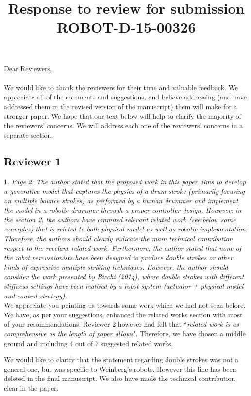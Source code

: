 \documentclass[]{article}
\title{Response to review for submission ROBOT-D-15-00326}
\author{}
\date{\vspace{-0.5cm}}
\begin{document}
\maketitle
\noindent Dear Reviewers,\\ \\
\noindent We would like to thank the reviewers for their time and valuable feedback.  We appreciate all of the comments and suggestions, and believe addressing (and have addressed them in the revised version of the manuscript) them will make for a stronger paper. We hope that our text below will help to clarify the majority of the reviewers' concerns. 
We will address each one of the reviewers' concerns in a separate section. 

\subsection*{Reviewer 1}
1. \textit{Page 2: The author stated that the proposed work in this paper aims to develop a generative model that captures the physics of a drum stroke
	(primarily focusing on multiple bounce strokes) as performed by a human drummer and implement the model in a robotic drummer through a proper
	controller design.  However, in the section 2, the authors have ommited relevant related work (see below some examples) that is related to both
	physical model as well as robotic implementation. Therefore, the authors should clearly indicate the main technical contribution respect to the
	revelant related work. Furthermore, the author stated that none of the robot percussionists have been designed to produce double strokes
	or other kinds of expressive multiple striking techniques. However, the author should consider the work presented by Bicchi (2014),
	where double strokes with different stiffness settings have been realized by a robot system (actuator + physical model and control strategy).}\\

\noindent We appreciate you pointing us towards some work which we had not seen before. We have, as per your suggestions, enhanced the related works section with most of your recommendations. Reviewer 2 however had felt that ``\textit{related work is as comprehensive as the length of paper allows}". Therefore, we have chosen a middle ground and including 4 out of 7 suggested related works. 

\noindent We would like to clarify that the statement regarding double strokes was not a general one, but was specific to Weinberg's robots. However this line has been deleted in the final manuscript.
\noindent We also have made the technical contribution clear in the paper. \\
\end{document}

